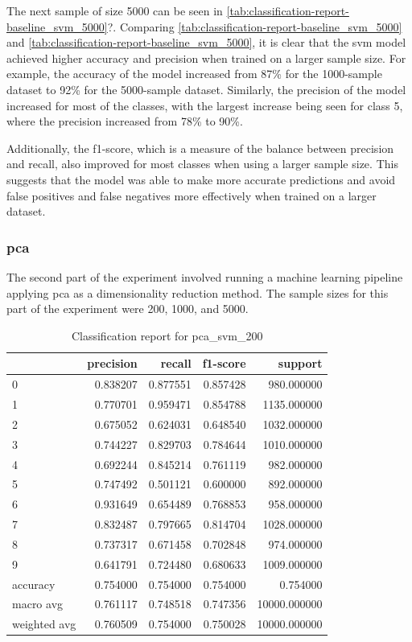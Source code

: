 The next sample of size 5000 can be seen in \ref{tab:classification-report-baseline_svm_5000}?.
Comparing \ref{tab:classification-report-baseline_svm_5000} and \ref{tab:classification-report-baseline_svm_5000}, it is clear that the \gls{svm} model achieved higher accuracy and precision when trained on a larger sample size. For example, the accuracy of the model increased from 87\% for the 1000-sample dataset to 92\% for the 5000-sample dataset. Similarly, the precision of the model increased for most of the classes, with the largest increase being seen for class 5, where the precision increased from 78\% to 90\%.

Additionally, the f1-score, which is a measure of the balance between precision and recall, also improved for most classes when using a larger sample size. This suggests that the model was able to make more accurate predictions and avoid false positives and false negatives more effectively when trained on a larger dataset.


\subsubsection{\gls{pca}}\label{subsubsec:experiment_4_pca}

The second part of the experiment involved running a machine learning pipeline applying \gls{pca} as a dimensionality reduction method. The sample sizes for this part of the experiment were 200, 1000, and 5000.

\begin{table}[htb!]
    \centering
    \caption{Classification report for pca_svm_200}
    \label{tab:classification-report-pca_svm_200}
    \begin{tabular}{lrrrr}
    \toprule
    & precision & recall & f1-score & support \\
    \midrule
    0 & 0.838207 & 0.877551 & 0.857428 & 980.000000 \\
    1 & 0.770701 & 0.959471 & 0.854788 & 1135.000000 \\
    2 & 0.675052 & 0.624031 & 0.648540 & 1032.000000 \\
    3 & 0.744227 & 0.829703 & 0.784644 & 1010.000000 \\
    4 & 0.692244 & 0.845214 & 0.761119 & 982.000000 \\
    5 & 0.747492 & 0.501121 & 0.600000 & 892.000000 \\
    6 & 0.931649 & 0.654489 & 0.768853 & 958.000000 \\
    7 & 0.832487 & 0.797665 & 0.814704 & 1028.000000 \\
    8 & 0.737317 & 0.671458 & 0.702848 & 974.000000 \\
    9 & 0.641791 & 0.724480 & 0.680633 & 1009.000000 \\
    accuracy & 0.754000 & 0.754000 & 0.754000 & 0.754000 \\
    macro avg & 0.761117 & 0.748518 & 0.747356 & 10000.000000 \\
    weighted avg & 0.760509 & 0.754000 & 0.750028 & 10000.000000 \\
    \bottomrule
    \end{tabular}
\end{table}


